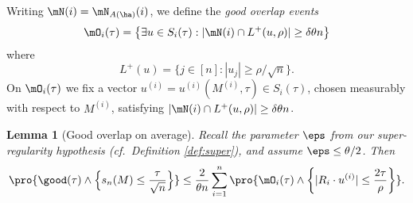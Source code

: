 \documentclass[aop,preprint]{imsart}
\theoremstyle{plain}
\newtheorem{lemma}[theorem]{Lemma}
\theoremstyle{definition}
\theoremstyle{remark}
\numberwithin{equation}{section}
\numberwithin{theorem}{section}
\begin{document}
Writing $\mN(i)= \mN_{A(\ha)}(i)$, we define the \emph{good overlap events}
\begin{equation}
\mO_i(\tau) = \big\{ \exists u\in S_i(\tau): |\mN(i) \cap L^+(u,\rho)|\ge \delta \theta n\big\}
\end{equation}
where 
\begin{equation}	\label{super:Lplus}
L^+(u)= \{j\in [n]: |u_j|\ge \rho/\sqrt{n}\}.
\end{equation}
On $\mO_i(\tau)$ we fix a vector $u^{(i)} = u^{(i)}(M^{(i)},\tau)\in S_i(\tau)$, chosen measurably with respect to $M^{(i)}$, satisfying $|\mN(i)\cap L^+(u,\rho)|\ge \delta \theta n$.

\begin{lemma}[Good overlap on average]	\label{lem:overlap}
Recall the parameter $\eps$ from our super-regularity hypothesis (cf.\ Definition \ref{def:super}), and assume $\eps\le \theta/2$. 
%
Then
\begin{equation}
\pro{\good(\tau)\wedge\Big\{ s_n(M)\le \frac{\tau}{\sqrt{n}}\Big\}} \le \frac{2}{\theta n} \sum_{i=1}^n \pro{ \mO_i(\tau)\wedge \bigg\{ |R_i\cdot u^{(i)}|\le \frac{2\tau}{\rho}\bigg\}}.
\end{equation}
\end{lemma}
\end{document}
